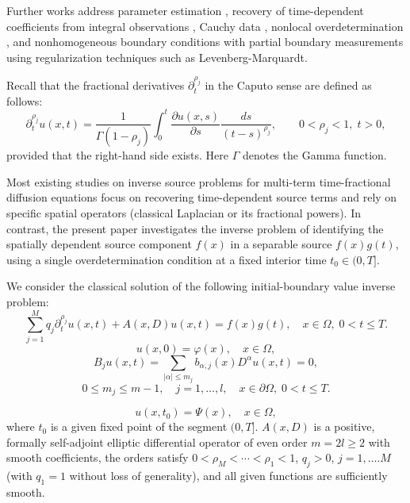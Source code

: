 \documentclass[12pt, reqno]{amsart}
\theoremstyle{definition}
\theoremstyle{remark}
\numberwithin{equation}{section}
\begin{document}
Further works address parameter estimation \cite{14}, recovery of time-dependent coefficients from integral observations \cite{15}, Cauchy data \cite{16}, nonlocal overdetermination \cite{17}, and nonhomogeneous boundary conditions with partial boundary measurements \cite{18} using regularization techniques such as Levenberg-Marquardt.

Recall that the fractional derivatives $\partial_t^{\rho_j}$ in the Caputo sense are defined as follows:
\[
\partial_t^{\rho_j} u(x,t)
=
\frac{1}{\Gamma(1-\rho_j)}
\int_0^t
\frac{\partial u(x,s)}{\partial s}
\frac{ds}{(t-s)^{\rho_j}},
\qquad 0<\rho_j<1,\; t>0,
\]
provided that the right-hand side exists. Here $\Gamma$ denotes the Gamma function.

Most existing studies on inverse source problems for multi-term time-fractional diffusion equations focus on recovering time-dependent source terms and rely on specific spatial operators (classical Laplacian or its fractional powers). In contrast, the present paper investigates the inverse problem of identifying the spatially dependent source component \(f(x)\) in a separable source \(f(x)g(t)\), using a single overdetermination condition at a fixed interior time \(t_0 \in (0,T]\).

We consider the classical solution of the following initial-boundary value inverse problem:
\begin{equation}\label{1.1}
 \sum_{j=1}^M q_j  \partial_t^{\rho_j} u(x,t) + A(x,D)u(x,t) = f(x)g(t), \quad x \in \Omega, \; 0 < t \le T.
\end{equation}
\begin{equation}\label{1.2}
    u(x,0) = \varphi(x), \quad x \in \Omega,
\end{equation}
\begin{equation}\label{1.3}
B_j u(x,t) = \sum_{|\alpha|\le m_j} b_{\alpha,j}(x) D^\alpha u(x,t) = 0,\end{equation}
 $$ 0 \le m_j \le m-1, \quad j=1,\dots,l, \quad x \in \partial \Omega, \; 0 < t \le T. $$

\begin{equation}\label{1.4}
    u(x, t_0) = \Psi(x), \quad x \in \Omega,
\end{equation}
where $t_0$ is a given fixed point of the segment $(0, T]$.  \(A(x,D)\) is a positive, formally self-adjoint elliptic differential operator of even order \(m = 2l \ge 2\) with smooth coefficients, the orders satisfy \(0 < \rho_M < \cdots < \rho_1 < 1\), \(q_j > 0\), $j=1,\dots.M$ (with \(q_1 = 1\) without loss of generality), and all given functions are sufficiently smooth.
\end{document}
